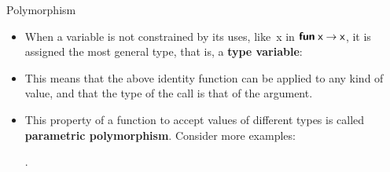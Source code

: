 %
\begin{frame}{Polymorphism}

  \begin{itemize}

    \item When a variable is not constrained by its uses,
      like~\textsf{x} in $\textsf{\textbf{fun}} \; \textsf{x} \rightarrow \textsf{x}$,
      it is assigned the most general type, that is, a \textbf{type
        variable}:\\
      \noindent{}

      \noindent{}

    \item This means that the above identity function can be applied
      to any kind of value, and that the type of the call is that of
      the argument.

    \item This property of a function to accept values of different
      types is called \textbf{parametric polymorphism}. Consider more
      examples:\\
      \noindent{}

      \noindent\topout{\textbf{-} : $\alpha \times \beta \times
        \gamma \rightarrow \alpha$}.

      \noindent{}

      \noindent{}

      \noindent{}

      \noindent{}

  \end{itemize}

\end{frame}

